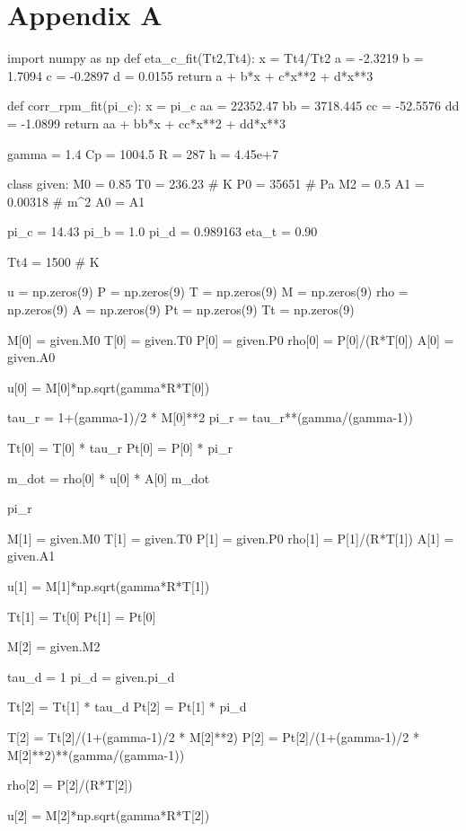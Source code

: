 \documentclass[journal ]{new-aiaa}
\begin{document}
\pagebreak 
\pagebreak 
\pagebreak 




\pagebreak
\section{Appendix A}
\begin{python}
import numpy as np
def eta_c_fit(Tt2,Tt4):
    x = Tt4/Tt2
    a = -2.3219 
    b = 1.7094 
    c = -0.2897 
    d = 0.0155
    return a + b*x + c*x**2 + d*x**3

def corr_rpm_fit(pi_c):
    x = pi_c
    aa = 22352.47 
    bb = 3718.445 
    cc = -52.5576 
    dd = -1.0899
    return aa + bb*x + cc*x**2 + dd*x**3

gamma = 1.4
Cp = 1004.5
R = 287
h = 4.45e+7

class given:
    M0 = 0.85
    T0 = 236.23 # K
    P0 = 35651 # Pa
    M2 = 0.5 
    A1 = 0.00318 # m^2
    A0 = A1
    
    pi_c = 14.43
    pi_b = 1.0
    pi_d = 0.989163
    eta_t = 0.90
    
    Tt4 = 1500 # K

u = np.zeros(9)
P = np.zeros(9)
T = np.zeros(9)
M = np.zeros(9)
rho = np.zeros(9)
A = np.zeros(9)
Pt = np.zeros(9)
Tt = np.zeros(9)

M[0] = given.M0
T[0] = given.T0
P[0] = given.P0
rho[0] = P[0]/(R*T[0])
A[0] = given.A0

u[0] = M[0]*np.sqrt(gamma*R*T[0])

tau_r = 1+(gamma-1)/2 * M[0]**2
pi_r = tau_r**(gamma/(gamma-1))

Tt[0] = T[0] * tau_r
Pt[0] = P[0] * pi_r

m_dot = rho[0] * u[0] * A[0]
m_dot

pi_r

M[1] = given.M0
T[1] = given.T0
P[1] = given.P0
rho[1] = P[1]/(R*T[1])
A[1] = given.A1

u[1] = M[1]*np.sqrt(gamma*R*T[1])


Tt[1] = Tt[0]
Pt[1] = Pt[0]

M[2] = given.M2

tau_d = 1
pi_d = given.pi_d

Tt[2] = Tt[1] * tau_d
Pt[2] = Pt[1] * pi_d

T[2] = Tt[2]/(1+(gamma-1)/2 * M[2]**2)
P[2] = Pt[2]/(1+(gamma-1)/2 * M[2]**2)**(gamma/(gamma-1))

rho[2] = P[2]/(R*T[2])

u[2] = M[2]*np.sqrt(gamma*R*T[2])


\end{python}
\end{document}
